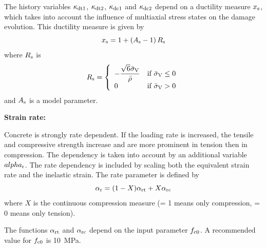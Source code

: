 \documentclass[a4paper]{article}
\begin{document}
The history variables $\kappa_{\rm dt1}$, $\kappa_{\rm dt2}$, $\kappa_{\rm dc1}$ and $\kappa_{\rm dc2}$ depend on a ductility measure $x_{\rm s}$, which takes into account the influence of multiaxial stress states on the damage evolution.
This ductility measure is given by
\begin{equation}
x_{\rm s} = 1+ \left(A_{\rm s}-1\right) R_{\rm s}
\end{equation}
where $R_{\rm s}$ is
\begin{equation}
R_{\rm s} = \left \{ \begin{array}{ll} -\dfrac{\sqrt{6} \bar{\sigma}_{\rm V}}{\bar{\rho}} & \mbox{if $\bar{\sigma}_{\rm V} \leq 0$} \\
    0 & \mbox{if $\bar{\sigma}_{\rm V} > 0$}  \end{array} \right.
\end{equation}
and $A_{\rm s}$ is a model parameter.
 
\noindent\textbf{Strain rate:}

Concrete is strongly rate dependent. If the loading rate is increased, the tensile and compressive strength increase and are more prominent in tension then in compression. The dependency is taken into account by an additional variable $alpha_{\rm r}$. The rate dependency is included by scaling both the equivalent strain rate and the inelastic strain. The rate parameter is defined by
\begin{equation}
\alpha_{\rm r}=(1-X) \alpha_{\rm rt} + X  \alpha_{\rm rc}
\end{equation}
where $X$ is the continuous compression measure (= 1 means only compression, = 0 means only tension).

The functions $\alpha_{\rm rt}$ and $\alpha_{\rm rc}$ depend on the input parameter $f_{\rm c0}$. A recommended value for $f_{\rm c0}$ is 10~MPa.
\end{document}
